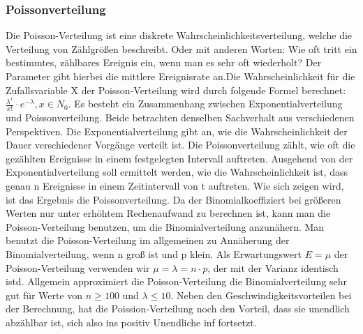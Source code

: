 \documentclass[letterpaper, titlepage]{article}
\begin{document}
\subsubsection{Poissonverteilung}\label{Poissonverteilung}
Die Poisson-Verteilung ist eine diskrete Wahrscheinlichkeitsverteilung, welche die Verteilung von Zählgrößen beschreibt. Oder mit anderen Worten: Wie oft tritt ein bestimmtes, zählbares Ereignis ein, wenn man es sehr oft wiederholt? Der Parameter gibt hierbei die mittlere Ereignisrate an.Die Wahrscheinlichkeit für die Zufallsvariable X der Poisson-Verteilung wird durch folgende Formel berechnet: $\frac{\lambda^x}{x!}\cdot e^{-\lambda}, x\in N_0$. Es besteht ein Zusammenhang zwischen Exponentialverteilung und Poissonverteilung. Beide betrachten denselben Sachverhalt aus verschiedenen Perspektiven. Die Exponentialverteilung gibt an, wie die Wahrscheinlichkeit der Dauer verschiedener Vorgänge verteilt ist. Die Poissonverteilung zählt, wie oft die gezählten Ereignisse in einem festgelegten Intervall auftreten. Ausgehend von der Exponentialverteilung soll ermittelt werden, wie die Wahrscheinlichkeit ist, dass genau n Ereignisse in einem Zeitintervall von t auftreten. Wie sich zeigen wird, ist das Ergebnis die Poissonverteilung. Da der Binomialkoeffiziert bei größeren Werten nur unter erhöhtem Rechenaufwand zu berechnen ist, kann man die Poisson-Verteilung benutzen, um die Binomialverteilung anzunähern. Man benutzt die Poisson-Verteilung im allgemeinen zu Annäherung der Binomialverteilung, wenn n groß ist und p klein. Als Erwartungswert $E=\mu$ der Poisson-Verteilung verwenden wir $\mu=\lambda=n \cdot p$, der mit der Varianz identisch istd. Allgemein approximiert die Poisson-Verteilung die Binomialverteilung sehr gut für Werte von $n \geq 100$ und $\lambda \leq 10$. Neben den Geschwindigkeitsvorteilen bei der Berechnung, hat die Poission-Verteilung noch den Vorteil, dass sie unendlich abzählbar ist, sich also ins positiv Unendliche inf fortsetzt.
\end{document}
